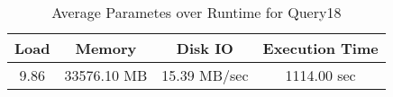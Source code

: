 \documentclass[../../main.tex]{subfiles}
\begin{document}
\begin{minipage}{.5\textwidth}
    \end{minipage}
    \begin{table}
        \begin{center}
            \begin{tabular}{ |c|c|c|c| } 
            \hline
            Load & Memory & Disk IO & Execution Time\\
            \hline
            9.86 & 33576.10 MB & 15.39 MB/sec & 1114.00 sec \\
            \hline
            \end{tabular}
            \\[1pt]
            \caption{Average Parametes over Runtime for Query18}
        \end{center}
    \end{table}
    \pagebreak
\end{document}
